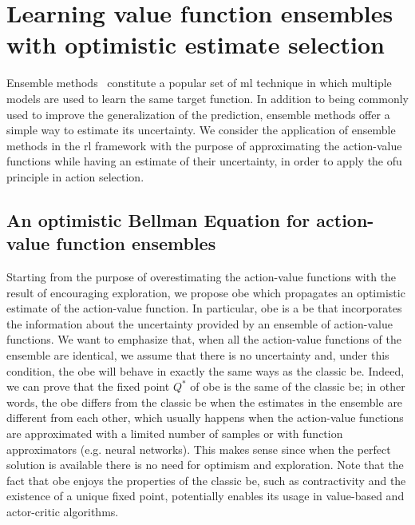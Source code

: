 \section{Learning value function ensembles with optimistic estimate selection}
\label{sec:obe}
Ensemble methods~\cite{opitz1999popular} constitute a popular set of \gls{ml} technique in which multiple models are used to learn the same target function. In addition to being commonly used to improve the generalization of the prediction, ensemble methods offer a simple way to estimate its uncertainty. We consider the application of ensemble methods in the \gls{rl} framework with the purpose of approximating the action-value functions while having an estimate of their uncertainty, in order to apply the \gls{ofu} principle in action selection.

\subsection{An optimistic Bellman Equation for action-value function ensembles}
Starting from the purpose of overestimating the action-value functions with the result of encouraging exploration, we propose \gls{obe} which propagates an optimistic estimate of the action-value function. In particular, \gls{obe} is a \gls{be} that incorporates the information about the uncertainty provided by an ensemble of action-value functions. We want to emphasize that, when all the action-value functions of the ensemble are identical, we assume that there is no uncertainty and, under this condition, the \gls{obe} will behave in exactly the same ways as the classic \gls{be}. Indeed, we can prove that the fixed point $Q^*$ of \gls{obe} is the same of the classic \gls{be}; in other words, the \gls{obe} differs from the classic \gls{be} when the estimates in the ensemble are different from each other, which usually happens when the action-value functions are approximated with a limited number of samples or with function approximators (e.g. neural networks). This makes sense since when the perfect solution is available there is no need for optimism and exploration. 
Note that the fact that \gls{obe} enjoys the properties of the classic \gls{be}, such as contractivity and the existence of a unique fixed point, potentially enables its usage in value-based and actor-critic algorithms.

